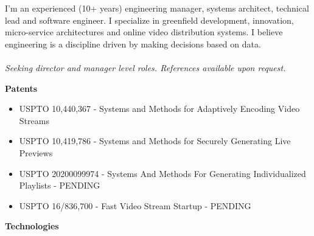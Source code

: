 \documentclass{article}
\begin{document}
I'm an experienced (10+ years) engineering manager, systems
architect, technical lead and software \mbox{engineer}. I specialize in
greenfield development, innovation, micro-service architectures and
online video distribution systems. I believe engineering is a
discipline driven by making decisions based on data.
\\
\\
\textit{Seeking director and manager level roles. References available upon request.}

\vspace{10pt}\textbf{Patents}

\vspace{5pt}\begin{small}
\begin{itemize}[nosep,label=,leftmargin=*]
\item USPTO 10,440,367 - Systems and Methods for Adaptively Encoding Video Streams
\item USPTO 10,419,786 - Systems and Methods for Securely Generating Live Previews
\item USPTO 20200099974 - Systems And Methods For Generating Individualized Playlists - {\tiny PENDING}
\item USPTO 16/836,700 - Fast Video Stream Startup - {\tiny PENDING}
\end{itemize}
\end{small}

\vspace{10pt}\textbf{Technologies}
\end{document}
